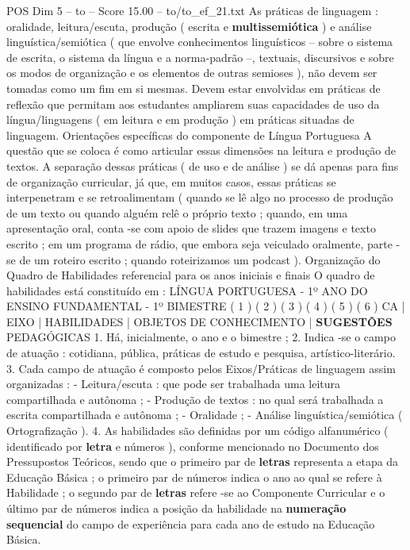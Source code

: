 \begin{textsample}{POS Dim 5 – to – Score 15.00 – to/to\_ef\_21.txt}  \label{ex:f5_pos_023}
As práticas de linguagem : oralidade, leitura/escuta, produção ( escrita e \textbf{multissemiótica} ) e análise linguística/semiótica ( que envolve conhecimentos linguísticos – sobre o sistema de escrita, o sistema da língua e a norma-padrão –, textuais, discursivos e sobre os modos de organização e os elementos de outras semioses ), não devem ser tomadas como um fim em si mesmas.
Devem estar envolvidas em práticas de reflexão que permitam aos estudantes ampliarem suas capacidades de uso da língua/linguagens ( em leitura e em produção ) em práticas situadas de linguagem.
Orientações específicas do componente de Língua Portuguesa A questão que se coloca é como articular essas dimensões na leitura e produção de textos.
A separação dessas práticas ( de uso e de análise ) se dá apenas para fins de organização curricular, já que, em muitos casos, essas práticas se interpenetram e se retroalimentam ( quando se lê algo no processo de produção de um texto ou quando alguém relê o próprio texto ; quando, em uma apresentação oral, conta -se com apoio de slides que trazem imagens e texto escrito ; em um programa de rádio, que embora seja veiculado oralmente, parte -se de um roteiro escrito ; quando roteirizamos um podcast ).
Organização do Quadro de Habilidades referencial para os anos iniciais e finais O quadro de habilidades está constituído em : LÍNGUA PORTUGUESA - 1º ANO DO ENSINO FUNDAMENTAL - 1º BIMESTRE ( 1 ) ( 2 ) ( 3 ) ( 4 ) ( 5 ) ( 6 ) CA | EIXO | HABILIDADES | OBJETOS DE CONHECIMENTO | \textbf{SUGESTÕES} PEDAGÓGICAS 1.
Há, inicialmente, o ano e o bimestre ; 2.
Indica -se o campo de atuação : cotidiana, pública, práticas de estudo e pesquisa, artístico-literário. 3.
Cada campo de atuação é composto pelos Eixos/Práticas de linguagem assim organizadas : - Leitura/escuta : que pode ser trabalhada uma leitura compartilhada e autônoma ; - Produção de textos : no qual será trabalhada a escrita compartilhada e autônoma ; - Oralidade ; - Análise linguística/semiótica ( Ortografização ). 4.
As habilidades são definidas por um código alfanumérico ( identificado por \textbf{letra} e números ), conforme mencionado no Documento dos Pressupostos Teóricos, sendo que o primeiro par de \textbf{letras} representa a etapa da Educação Básica ; o primeiro par de números indica o ano ao qual se refere à Habilidade ; o segundo par de \textbf{letras} refere -se ao Componente Curricular e o último par de números indica a posição da habilidade na \textbf{numeração} \textbf{sequencial} do campo de experiência para cada ano de estudo na Educação Básica.

\end{textsample}
